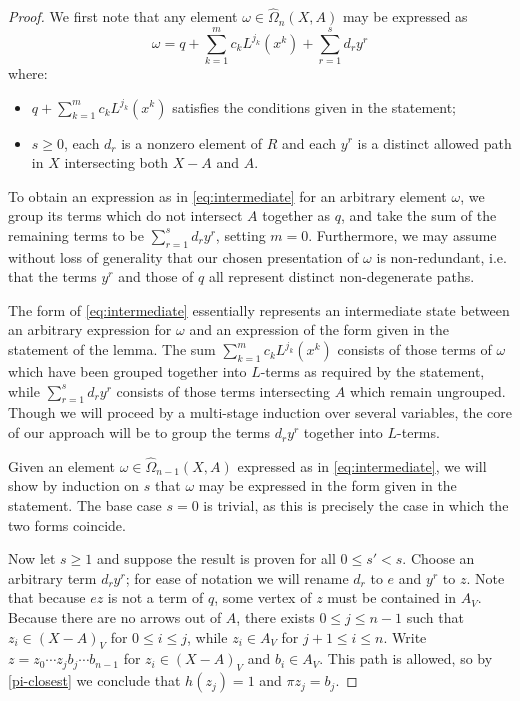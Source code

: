 \documentclass[11pt]{article}
\theoremstyle{definition}
\numberwithin{equation}{section}
\newcommand{\tOmega}{\widehat{\Omega}}
\begin{document}
\begin{proof}
We first note that any element $\omega \in \tOmega_n(X,A)$ may be expressed as
\begin{equation}\label{eq:intermediate} \omega=
q + \sum_{k=1}^m c_k L^{j_k}(x^k) + \sum_{r = 1}^{s} d_r y^r
\end{equation}
where:
\begin{itemize}
    \item $q + \sum_{k=1}^m c_k L^{j_k}(x^k)$ satisfies the conditions given in the statement;
    \item $s \geq 0$, each $d_r$ is a nonzero element of $R$ and each $y^r$ is a distinct allowed path in $X$ intersecting both $X - A$ and $A$.
\end{itemize}
To obtain an expression as in \cref{eq:intermediate} for an arbitrary element $\omega$, we group its terms which do not intersect $A$ together as $q$, and take the sum of the remaining terms to be $\sum_{r = 1}^{s} d_r y^r$, setting $m = 0$. Furthermore,  we may assume without loss of generality that our chosen presentation of $\omega$ is non-redundant, i.e.  that the terms $y^r$ and those of $q$ all represent distinct non-degenerate paths.

The form of \cref{eq:intermediate} essentially represents an intermediate state between an arbitrary expression for $\omega$ and an expression of the form given in the statement of the lemma. The sum $\sum_{k=1}^m c_k L^{j_k}(x^k)$ consists of those terms of $\omega$ which have been grouped together into $L$-terms as required by the statement, while $\sum_{r = 1}^{s} d_r y^r$ consists of those terms intersecting $A$ which remain ungrouped. Though we will proceed by a multi-stage induction over several variables, the core of our approach will be to group the terms $d_r y^r$ together into $L$-terms. 

Given an element $\omega \in \tOmega_{n-1}(X,A)$ expressed as in \cref{eq:intermediate}, we will show by induction on $s$ that $\omega$ may be expressed in the form given in the statement. The base case $s = 0$ is trivial, as this is precisely the case in which the two forms coincide.

Now let $s \geq 1$ and suppose the result is proven for all $0 \leq s' < s$. Choose an arbitrary term $d_r y^r$; for ease of notation we will rename $d_r$ to $e$ and $y^r$ to $z$. Note that because $e z$ is not a term of $q$, some vertex of $z$ must be contained in $A_V$. Because there are no arrows out of $A$, there exists $0 \leq j \leq n-1$ such that $z_i \in (X-A)_V$ for $0 \leq i \leq j$, while $z_i \in A_V$ for $j + 1 \leq i \leq n$. Write $z = z_0 \cdots z_j b_j \cdots b_{n-1}$ for $z_i \in (X-A)_V$ and $b_i \in A_V$. This path is allowed, so by \cref{pi-closest} we conclude that $h(z_j) = 1$ and $\pi z_j = b_j$.


\end{proof}
\end{document}
